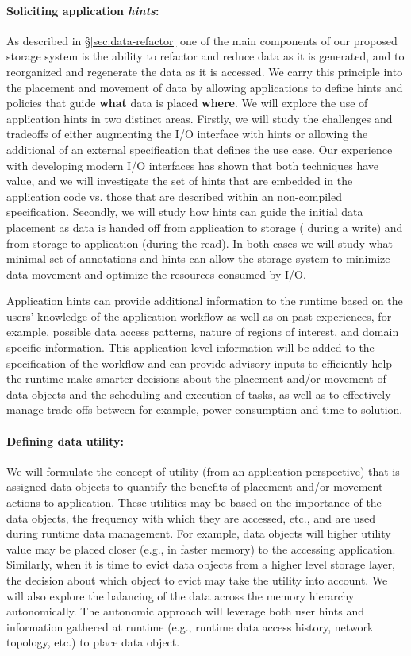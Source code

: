 \paragraph{Soliciting application {\em hints}:}
As described in \S\ref{sec:data-refactor} one of the main components of our
proposed storage system is the ability to refactor and reduce data as it is
generated, and to reorganized and regenerate the data as it is accessed. We
carry this principle into the placement and movement of data by allowing
applications to define hints and policies that guide \textbf{what} data is
placed \textbf{where}. We will explore the use of application hints in two
distinct areas. Firstly, we will study the challenges and tradeoffs of either
augmenting the I/O interface with hints or allowing the additional of an
external specification that defines the use case. Our experience with
developing modern I/O interfaces has shown that both techniques have value,
and we will investigate the set of hints that are embedded in the
application code vs. those that are described within an non-compiled
specification. Secondly, we will study how hints can guide the initial data
placement as data is handed off from application to storage ( during a
write) and from storage to application (during the read). In both cases we
will study what minimal set of annotations and hints can allow the storage
system to minimize data movement and optimize the resources consumed by I/O. 

Application hints can provide additional information to the runtime based on the users' knowledge of the application workflow as well as on past experiences, for example, possible data access patterns, nature of regions of interest, and domain specific information. This application level information will be added to the specification of the workflow and can provide advisory inputs to efficiently help the runtime make smarter decisions about the placement and/or movement of data objects and the scheduling and execution of tasks, as well as to effectively manage trade-offs between for example, power consumption and time-to-solution. 


\paragraph{Defining data utility:} We will formulate the concept of utility (from an
application perspective) that is assigned data objects to quantify the
benefits of placement and/or movement actions to application. These
utilities may be based on the importance of the data objects, the frequency
with which they are accessed, etc., and are used during runtime data
management. For example, data objects will higher utility value may be
placed closer (e.g., in faster memory) to the accessing application.
Similarly, when it is time to evict data objects from a higher level storage
layer, the decision about which object to evict may take the utility into
account. We will also explore the balancing of the data across the memory
hierarchy autonomically. The autonomic approach will leverage both user
hints and information gathered at runtime (e.g., runtime data access
history, network topology, etc.) to place data object.

